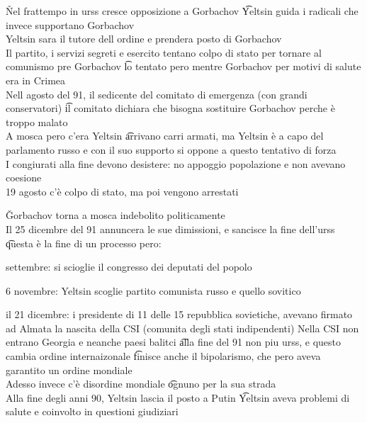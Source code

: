 \documentclass[12pt]{article}
\begin{document}
\v

Nel frattempo in urss cresce opposizione a Gorbachov \t Yeltsin guida i radicali che invece supportano Gorbachov \\
Yeltsin sara il tutore dell ordine e prendera posto di Gorbachov \\
Il partito, i servizi segreti e esercito tentano colpo di stato per tornare al comunismo pre Gorbachov \t lo tentato pero mentre Gorbachov per motivi di salute era in Crimea \\
Nell agosto del 91, il sedicente del comitato di emergenza (con grandi conservatori) \t il comitato dichiara che bisogna sostituire Gorbachov perche è troppo malato \\
A mosca pero c'era Yeltsin \t arrivano carri armati, ma Yeltsin è a capo del parlamento russo e con il suo supporto si oppone a questo tentativo di forza \\
I congiurati alla fine devono desistere: no appoggio popolazione e non avevano coesione \\
19 agosto c'è colpo di stato, ma poi vengono arrestati

\v

Gorbachov torna a mosca indebolito politicamente \\
Il 25 dicembre del 91 annuncera le sue dimissioni, e sancisce la fine dell'urss \t questa è la fine di un processo pero:
\bi
  \item settembre: si scioglie il congresso dei deputati del popolo
  \item 6 novembre: Yeltsin scoglie partito comunista russo e quello sovitico
  \item il 21 dicembre: i presidente di 11 delle 15 repubblica sovietiche, avevano firmato ad Almata la nascita della CSI (comunita degli stati indipendenti)
\ei
Nella CSI non entrano Georgia e neanche paesi balitci \t alla fine del 91 non piu urss, e questo cambia ordine internaizonale \t finisce anche il bipolarismo, che pero aveva garantito un ordine mondiale \\
Adesso invece c'è disordine mondiale \t ognuno per la sua strada \\
Alla fine degli anni 90, Yeltsin lascia il posto a Putin \t Yeltsin aveva problemi di salute e coinvolto in questioni giudiziari
\end{document}

